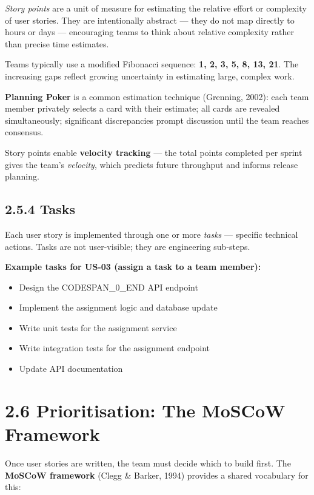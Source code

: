 \documentclass[11pt,a4paper]{book}
\begin{document}
\textit{Story points} are a unit of measure for estimating the relative effort or complexity of user stories. They are intentionally abstract --- they do not map directly to hours or days --- encouraging teams to think about relative complexity rather than precise time estimates.

Teams typically use a modified Fibonacci sequence: \textbf{1, 2, 3, 5, 8, 13, 21}. The increasing gaps reflect growing uncertainty in estimating large, complex work.

\textbf{Planning Poker} is a common estimation technique (Grenning, 2002): each team member privately selects a card with their estimate; all cards are revealed simultaneously; significant discrepancies prompt discussion until the team reaches consensus.

Story points enable \textbf{velocity tracking} --- the total points completed per sprint gives the team's \textit{velocity}, which predicts future throughput and informs release planning.

\subsection{2.5.4 Tasks}

Each user story is implemented through one or more \textit{tasks} --- specific technical actions. Tasks are not user-visible; they are engineering sub-steps.

\textbf{Example tasks for US-03 (assign a task to a team member):}

\begin{itemize}
  \item Design the CODESPAN\_0\_END API endpoint
  \item Implement the assignment logic and database update
  \item Write unit tests for the assignment service
  \item Write integration tests for the assignment endpoint
  \item Update API documentation
\end{itemize}

\medskip

\section{2.6 Prioritisation: The MoSCoW Framework}

Once user stories are written, the team must decide which to build first. The \textbf{MoSCoW framework} (Clegg \& Barker, 1994) provides a shared vocabulary for this:
\end{document}
